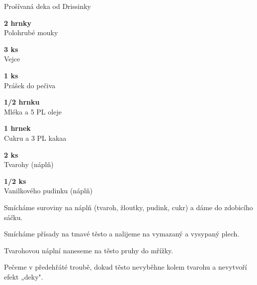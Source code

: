 \documentclass[11pt,a4paper]{article}
\begin{document}
\begin{recipe}[RoyalPurple]{Prošívaná deka od Drissinky}
    \begin{ingredients}
        \item \parbox[t]{\linewidth}{\raggedright \piece \textbf{2 hrnky}\\ Polohrubé mouky}
        \item \parbox[t]{\linewidth}{\raggedright \piece \textbf{3 ks}\\ Vejce}
        \item \parbox[t]{\linewidth}{\raggedright \piece \textbf{1 ks}\\ Prášek do pečiva}
        \item \parbox[t]{\linewidth}{\raggedright \liquid \textbf{1/2 hrnku}\\ Mléka a 5 PL oleje}
        \item \parbox[t]{\linewidth}{\raggedright \piece \textbf{1 hrnek}\\ Cukru a 3 PL kakaa}
        \item \parbox[t]{\linewidth}{\raggedright \piece \textbf{2 ks}\\ Tvarohy (náplň)}
        \item \parbox[t]{\linewidth}{\raggedright \piece \textbf{1/2 ks}\\ Vanilkového pudinku (náplň)}
    \end{ingredients}
    \begin{steps}
        \item Smícháme suroviny na náplň (tvaroh, žloutky, pudink, cukr) a dáme do zdobicího sáčku.
        \item Smícháme přísady na tmavé těsto a nalijeme na vymazaný a vysypaný plech.
        \item Tvarohovou náplní naneseme na těsto pruhy do mřížky.
        \item Pečeme v předehřáté troubě, dokud těsto nevyběhne kolem tvarohu a nevytvoří efekt „deky".
    \end{steps}
\end{recipe}
\end{document}
